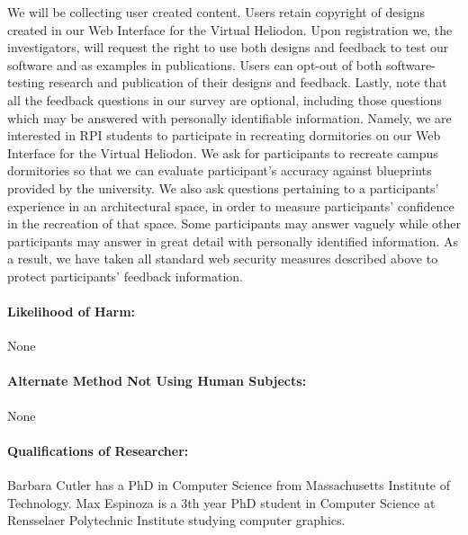 \documentclass[12pt]{article}
\begin{document}
We will be collecting user created content. 
Users retain copyright of designs created in our Web Interface for the Virtual Heliodon.  
Upon registration we, the investigators, will request the right to use both designs and feedback to test our software and as examples in publications.
Users can opt-out of both software-testing research and publication of their designs and feedback.
Lastly, note that all the feedback questions in our survey are optional, including those questions which may be answered with personally identifiable information. 
Namely, we are interested in RPI students to participate in recreating dormitories on our Web Interface for the Virtual Heliodon.
We ask for participants to recreate campus dormitories so that we can evaluate participant's accuracy against blueprints provided by the university.
We also ask questions pertaining to a participants' experience in an architectural space, in order to measure participants' confidence in the recreation of that space.
Some participants may answer vaguely while other participants may answer in great detail with personally identified information.
As a result, we have taken all standard web security measures described above to protect participants' feedback information.

\paragraph{Likelihood of  Harm:}   None

\paragraph{Alternate Method Not Using Human Subjects:} None

\paragraph{Qualifications of Researcher:}
Barbara Cutler has a PhD in Computer Science from Massachusetts
Institute of Technology.  Max Espinoza is a 3th year PhD student in
Computer Science at Rensselaer Polytechnic Institute studying computer
graphics.
\end{document}
